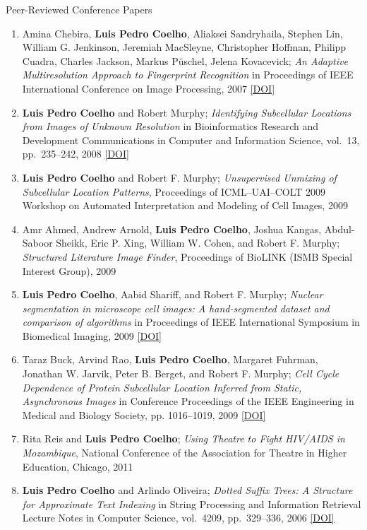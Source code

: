 \documentclass{article}
\renewcommand\subsection[1]{%
    \par\vspace{.1em}%
    {\hspace{1em}\subsubhead #1}%
    \par\vspace{.2em}%
}
\newcommand\showdoi[1]{%
    \href{http://dx.doi.org/#1}{[DOI]}%
}
\begin{document}
\subsection{Peer-Reviewed Conference Papers}
\begin{enumerate}
\item Amina Chebira, \textbf{Luis Pedro Coelho}, Aliaksei Sandryhaila, Stephen
Lin, William G. Jenkinson, Jeremiah MacSleyne, Christopher Hoffman, Philipp
Cuadra, Charles Jackson, Markus Püschel, Jelena Kovacevick; \emph{An Adaptive
Multiresolution Approach to Fingerprint Recognition} in Proceedings of IEEE
International Conference on Image Processing, 2007
\showdoi{10.1109/ICIP.2007.4378990}

\item \textbf{Luis Pedro Coelho} and Robert Murphy; \emph{Identifying
Subcellular Locations from Images of Unknown Resolution} in Bioinformatics
Research and Development Communications in Computer and Information Science,
vol.\ 13, pp.\ 235--242, 2008 \showdoi{10.1007/978-3-540-70600-7_18}

\item \textbf{Luis Pedro Coelho} and Robert F. Murphy; \emph{Unsupervised
Unmixing of Subcellular Location Patterns}, Proceedings of ICML--UAI--COLT 2009
Workshop on Automated Interpretation and Modeling of Cell Images, 2009

\item Amr Ahmed, Andrew Arnold, \textbf{Luis Pedro Coelho}, Joshua Kangas,
Abdul-Saboor Sheikk, Eric P. Xing, William W. Cohen, and Robert F. Murphy;
\emph{Structured Literature Image Finder}, Proceedings of BioLINK (ISMB Special
Interest Group), 2009

\item \textbf{Luis Pedro Coelho}, Aabid Shariff, and Robert F. Murphy;
\emph{Nuclear segmentation in microscope cell images: A hand-segmented dataset
and comparison of algorithms} in Proceedings of IEEE International Symposium in
Biomedical Imaging, 2009 \showdoi{10.1109/ISBI.2009.5193098}

\item Taraz Buck, Arvind Rao, \textbf{Luis Pedro Coelho}, Margaret Fuhrman,
Jonathan W. Jarvik, Peter B. Berget, and Robert F. Murphy; \emph{Cell Cycle
Dependence of Protein Subcellular Location Inferred from Static, Asynchronous
Images} in Conference Proceedings of the IEEE Engineering in Medical and
Biology Society, pp. 1016--1019, 2009 \showdoi{10.1109/IEMBS.2009.5332888}

\item Rita Reis and \textbf{Luis Pedro Coelho}; \emph{Using Theatre to Fight
HIV/AIDS in Mozambique}, National Conference of the Association for Theatre in
Higher Education, Chicago, 2011

\item \textbf{Luis Pedro Coelho} and Arlindo Oliveira; \emph{Dotted Suffix
Trees: A Structure for Approximate Text Indexing} in String Processing and
Information Retrieval Lecture Notes in Computer Science, vol.\ 4209, pp.\
329--336, 2006 \showdoi{10.1007/11880561_27}
\end{enumerate}
\end{document}
